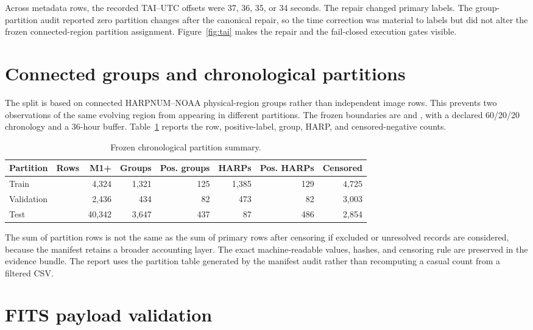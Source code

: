 \documentclass[11pt,oneside]{report}
\begin{document}
Across \TaiRows{} metadata rows, the recorded TAI--UTC offsets were 37, 36, 35, or 34 seconds. The repair changed \TaiLabelChanges{} primary labels. The group-partition audit reported zero partition changes after the canonical repair, so the time correction was material to labels but did not alter the frozen connected-region partition assignment. Figure~\ref{fig:tai} makes the repair and the fail-closed execution gates visible.

\section{Connected groups and chronological partitions}

The split is based on connected HARPNUM--NOAA physical-region groups rather than independent image rows. This prevents two observations of the same evolving region from appearing in different partitions. The frozen boundaries are \BoundaryOne{} and \BoundaryTwo{}, with a declared 60/20/20 chronology and a 36-hour buffer. Table~\ref{tab:partitions} reports the row, positive-label, group, HARP, and censored-negative counts.

\begin{table}[H]
\centering
\caption{Frozen chronological partition summary.}
\label{tab:partitions}
\begin{tabular}{lrrrrrrr}
\toprule
Partition & Rows & M1+ & Groups & Pos. groups & HARPs & Pos. HARPs & Censored \\
\midrule
Train & \TrainRows{} & 4,324 & 1,321 & 125 & 1,385 & 129 & 4,725 \\
Validation & \ValidationRows{} & 2,436 & 434 & 82 & 473 & 82 & 3,003 \\
Test & \TestRows{} & 40,342 & 3,647 & 437 & 87 & 486 & 2,854 \\
\bottomrule
\end{tabular}
\end{table}

The sum of partition rows is not the same as the sum of primary rows after censoring if excluded or unresolved records are considered, because the manifest retains a broader accounting layer. The exact machine-readable values, hashes, and censoring rule are preserved in the evidence bundle. The report uses the partition table generated by the manifest audit rather than recomputing a casual count from a filtered CSV.

\section{FITS payload validation}
\end{document}
